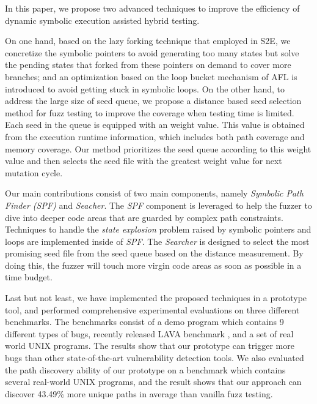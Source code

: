  In this paper, we propose two advanced techniques to improve the efficiency of dynamic symbolic execution assisted hybrid testing.
 
 On one hand, based on the lazy forking technique that employed in S2E\cite{chipounov2011s2e}, we concretize the symbolic pointers to avoid generating too many states but solve the pending states that forked from these pointers on demand to cover more branches; and an optimization based on the loop bucket mechanism of AFL \cite{online:afl} is introduced to avoid getting stuck in symbolic loops.
 On the other hand, to address the large size of seed queue, 
 we propose a distance based seed selection method for fuzz testing to improve the coverage when testing time is limited. 
 Each seed in the queue is equipped with an weight value.
 This value is obtained from the execution runtime information,
 which includes both path coverage and memory coverage.
 Our method prioritizes the seed queue according to this weight value and 
 then selects the seed file with the greatest weight value for next mutation cycle.


 Our main contributions consist of two main components, namely \emph{Symbolic Path Finder (SPF)} and \emph{Seacher}. 
 The \emph{SPF} component is leveraged to help the fuzzer to dive into deeper code areas 
 that are guarded by complex path constraints. 
 Techniques to handle the \textit{state explosion} problem 
 raised by symbolic pointers and loops are implemented inside of \emph{SPF}. 
 The \emph{Searcher} is designed to select the most promising seed file 
 from the seed queue based on the distance measurement. 
 By doing this, the fuzzer will touch more virgin code areas as soon as possible in a time budget. 

 Last but not least,  we have implemented the proposed techniques in a prototype tool,
 and performed comprehensive experimental evaluations on three different benchmarks. The benchmarks consist of a demo program which contains 9 different types of bugs, recently released LAVA benchmark \cite{dolan2016lava}, and a set of real world UNIX programs. The results show that our prototype can trigger more bugs than other state-of-the-art vulnerability detection tools. We also evaluated the path discovery ability of our prototype on a benchmark which contains several real-world UNIX programs, and the result shows that our approach can discover 43.49\% more unique paths in average than vanilla fuzz testing.

